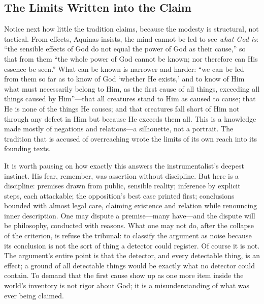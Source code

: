 \subsection{The Limits Written into the Claim}

Notice next how little the tradition claims, because the modesty is structural, not tactical. From effects, Aquinas insists, the mind cannot be led to see \emph{what God is}: ``the sensible effects of God do not equal the power of God as their cause,'' so that from them ``the whole power of God cannot be known; nor therefore can His essence be seen.'' What can be known is narrower and harder: ``we can be led from them so far as to know of God `whether He exists,' and to know of Him what must necessarily belong to Him, as the first cause of all things, exceeding all things caused by Him''---that all creatures stand to Him as caused to cause; that He is none of the things He causes; and that creatures fall short of Him not through any defect in Him but because He exceeds them all. This is a knowledge made mostly of negations and relations---a silhouette, not a portrait. The tradition that is accused of overreaching wrote the limits of its own reach into its founding texts.

It is worth pausing on how exactly this answers the instrumentalist's deepest instinct. His fear, remember, was assertion without discipline. But here is a discipline: premises drawn from public, sensible reality; inference by explicit steps, each attackable; the opposition's best case printed first; conclusions bounded with almost legal care, claiming existence and relation while renouncing inner description. One may dispute a premise---many have---and the dispute will be philosophy, conducted with reasons. What one may not do, after the collapse of the criterion, is refuse the tribunal: to classify the argument as noise because its conclusion is not the sort of thing a detector could register. Of course it is not. The argument's entire point is that the detector, and every detectable thing, is an effect; a ground of all detectable things would be exactly what no detector could contain. To demand that the first cause show up as one more item inside the world's inventory is not rigor about God; it is a misunderstanding of what was ever being claimed.

